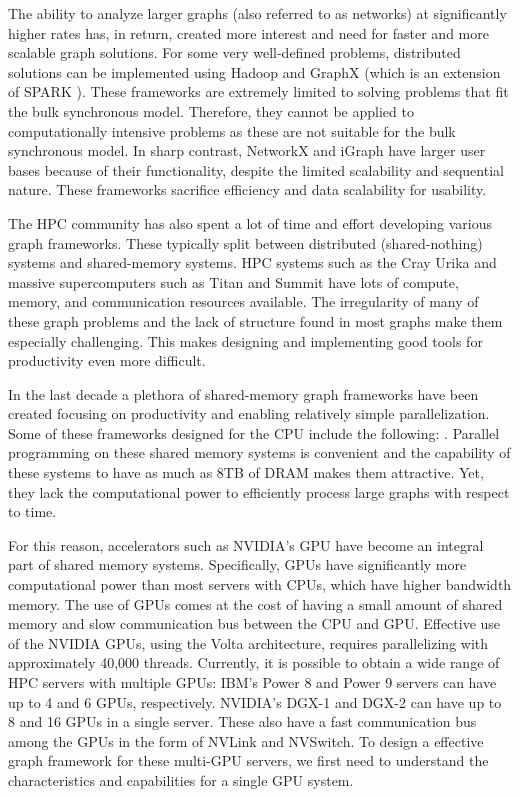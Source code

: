 The ability to analyze larger graphs (also referred to as networks) at significantly higher rates has, in return, created more interest and need for faster and more scalable graph solutions. For some very well-defined problems, distributed solutions can be implemented using Hadoop \cite{White:2009:HDG:1717298} and GraphX \cite{gonzalez2014graphx} (which is an extension of SPARK \cite{zaharia2010spark}). These frameworks are extremely limited to solving problems that fit the bulk synchronous model. Therefore, they cannot be applied to computationally intensive problems as these are not suitable for the bulk synchronous model. In sharp contrast, NetworkX\cite{SciPyProceedings_11} and iGraph\cite{Han:2010:IFC:1920841.1920901} have larger user bases because of their functionality, despite the limited scalability and sequential nature. These frameworks sacrifice efficiency and data scalability for usability.

The HPC community has also spent a lot of time and effort developing various graph frameworks. These typically split between distributed (shared-nothing) systems and shared-memory systems. HPC systems such as the Cray Urika and massive supercomputers such as Titan and Summit have lots of compute, memory, and communication resources available. The irregularity of many of these graph problems and the lack of structure found in most graphs make them especially challenging. This makes designing and implementing good tools for productivity even more difficult. 

In the last decade a plethora of shared-memory graph frameworks have been created focusing on productivity and enabling relatively simple parallelization. Some of these frameworks designed for the CPU include the following: \cite{stinger-tr,shun2013ligra,beamer2015gap,pingali2011tao,Sundaram:2015:GHP:2809974.2809983}. 
Parallel programming on these shared memory systems is convenient and the capability of these systems to have as much as 8TB of DRAM makes them attractive. Yet, they lack the computational power to efficiently process large graphs with respect to time. 

For this reason, accelerators such as NVIDIA's GPU have become an integral part of shared memory systems. Specifically, GPUs have significantly more computational power than most servers with CPUs, which have higher bandwidth memory. The use of GPUs comes at the cost of having a small amount of shared memory and slow communication bus between the CPU and GPU. Effective use of the NVIDIA GPUs, using the Volta architecture, requires parallelizing with approximately 40,000 threads. 
Currently, it is possible to obtain a wide range of HPC servers with multiple GPUs: IBM's Power 8 and Power 9 servers can have up to 4 and 6 GPUs, respectively. NVIDIA's DGX-1 and DGX-2 can have up to 8 and 16 GPUs in a single server. These also have a fast communication bus among the GPUs in the form of NVLink and NVSwitch\cite{foley2017ultra}.
To design a effective graph framework for these multi-GPU servers, we first need to understand the characteristics and capabilities for a single GPU system.

